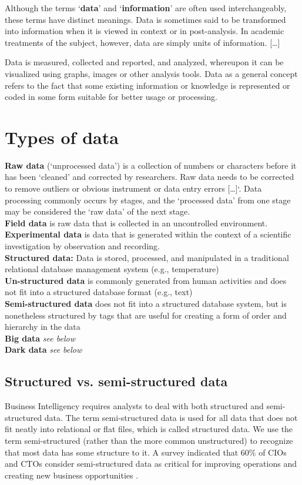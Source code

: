 Although the terms `\textbf{data}' and `\textbf{information}' are often used interchangeably, these terms have distinct meanings. Data is sometimes said to be transformed into information when it is viewed in context or in post-analysis. In academic treatments of the subject, however, data are simply units of information. [\dots]

Data is measured, collected and reported, and analyzed, whereupon it can be visualized using graphs, images or other analysis tools. Data as a general concept refers to the fact that some existing information or knowledge is represented or coded in some form suitable for better usage or processing. 





\section{Types of data}

\textbf{Raw data} (`unprocessed data') is a collection of numbers or characters before it has been `cleaned' and corrected by researchers. Raw data needs to be corrected to remove outliers or obvious instrument or data entry errors [\dots]`. Data processing commonly occurs by stages, and the `processed data' from one stage may be considered the `raw data' of the next stage.\\
\textbf{Field data} is raw data that is collected in an uncontrolled environment.\\
\textbf{Experimental data} is data that is generated within the context of a scientific investigation by observation and recording.\\
\textbf{Structured data:} Data is stored, processed, and manipulated in a traditional relational
database management system (e.g., temperature)\\
\textbf{Un-structured data} is commonly generated from human activities and does not
fit into a structured database format (e.g., text)\\
\textbf{Semi-structured data} does not fit into a structured database system, but is
nonetheless structured by tags that are useful for creating a form of order and
hierarchy in the data\\
\textbf{Big data} \textit{see below}\\
\textbf{Dark data} \textit{see below}


\pbn
\subsection{Structured vs. semi-structured data}
Business Intelligency requires analysts to deal with both structured and semi-structured data. The term semi-structured data is used for all data that does not fit neatly into relational or flat files, which is called structured data.
We use the term semi-structured (rather than the more common unstructured) to recognize that most data has some structure to it. A survey indicated that 60\% of CIOs and CTOs consider semi-structured data as critical for improving operations and creating new business opportunities \citep{Blumberg2003Problem}.

